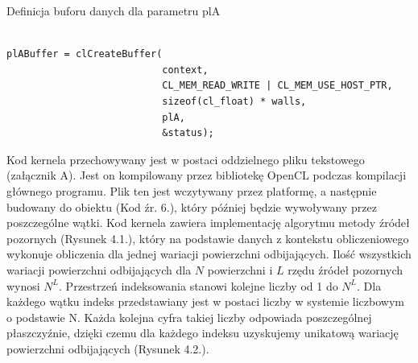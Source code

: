 \begin{program}
\caption{Definicja buforu danych dla parametru plA}
\begin{lstlisting}

plABuffer = clCreateBuffer(
                           context, 
                           CL_MEM_READ_WRITE | CL_MEM_USE_HOST_PTR,
                           sizeof(cl_float) * walls,
                           plA, 
                           &status);
\end{lstlisting}
\end{program}
Kod kernela przechowywany jest w postaci oddzielnego pliku tekstowego (załącznik A). Jest on kompilowany przez bibliotekę OpenCL podczas kompilacji głównego programu. Plik ten jest wczytywany przez platformę, a następnie budowany do obiektu (Kod źr. 6.), który później będzie wywoływany przez poszczególne wątki. Kod kernela zawiera implementację algorytmu metody źródeł pozornych (Rysunek 4.1.), który na podstawie danych z kontekstu obliczeniowego wykonuje obliczenia dla jednej wariacji powierzchni odbijających. Ilość wszystkich wariacji powierzchni odbijających dla $N$ powierzchni i $L$ rzędu źródeł pozornych wynosi $N^L$. Przestrzeń indeksowania stanowi kolejne liczby od 1 do $N^L$. Dla każdego wątku indeks przedstawiany jest w postaci liczby w systemie liczbowym o podstawie N. Każda kolejna cyfra takiej liczby odpowiada poszczególnej płaszczyźnie, dzięki czemu dla każdego indeksu uzyskujemy unikatową wariację powierzchni odbijających (Rysunek 4.2.).

